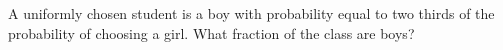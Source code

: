 A uniformly chosen student is a boy with probability equal to two thirds of the probability of choosing a girl. What fraction of the class are boys?
